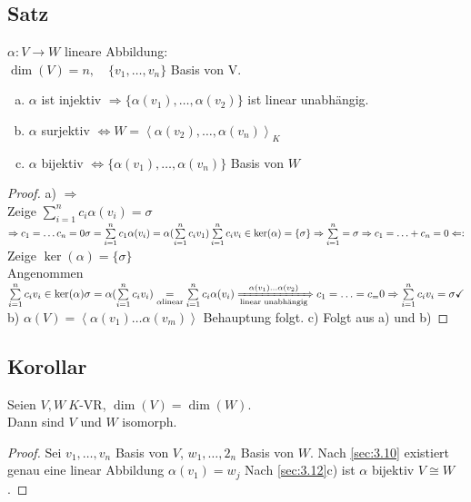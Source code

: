 \subsection{Satz}\label{sec:\thesubsection}
$\alpha: V \to W$ lineare Abbildung:\\
$\dim(V) =n, \quad \{v_1,\ldots,v_n\} $ Basis von V.
\begin{enumerate}[a)]
\item $\alpha$ ist injektiv $\Rightarrow \{ \alpha(v_1),\ldots,\alpha(v_2) \}$ ist linear unabhängig.
\item $\alpha$ surjektiv $\Leftrightarrow W = \left\langle \alpha(v_2),\ldots,\alpha(v_n)\right\rangle_K$
\item $\alpha$ bijektiv $\Leftrightarrow \{ \alpha(v_1),\ldots,\alpha(v_n) \}$ Basis von $W$
\end{enumerate}
\begin{proof}
a) $\Rightarrow$\\
Zeige $\sum\limits^{n}_{i=1}c_i\alpha(v_i) = \sigma$\\
\phantom{Zeige }$\Rightarrow c_1 = \ldots c_n = 0\\
\sigma = \sum\limits^{n}_{i=1} c_1 \alpha (v_i) = \alpha(\sum\limits^{n}_{i=1}c_iv_1)\\
\sum\limits^{n}_{i=1}c_iv_i \in \ker(\alpha) = \{ \sigma \}\\
\Rightarrow \sum\limits^{n}_{i=1} = \sigma \Rightarrow c_1 = \ldots + c_n = 0\\
\Leftarrow:$ Zeige $\ker(\alpha) = \{\sigma \}$\\
Angenommen $\sum\limits^{n}_{i=1}c_iv_i \in \ker(\alpha) 
\sigma = \alpha (\sum\limits^{n}_{i=1}c_iv_i) \underset{\alpha \text{linear}}{=} \sum\limits^{n}_{i=1}c_i\alpha(v_i) \xRightarrow[ \text{linear unabhängig} ]{\alpha(v_1)\ldots\alpha(v_2)}
c_1 = \ldots = c_ = 0\\
\Rightarrow \sum\limits^{n}_{i=1} c_iv_i = \sigma \checkmark$
b) $\alpha(V) = \left\langle \alpha(v_1)\ldots\alpha(v_m)\right\rangle$ Behauptung folgt.
c) Folgt aus a) und b)
\end{proof}
\subsection{Korollar}\label{sec:\thesubsection}
Seien $V,W\ K$-VR, $\dim(V) = \dim(W)$.\\
Dann sind $V$ und $W$ isomorph.
\begin{proof}
Sei $v_1,\ldots,v_n$ Basis von $V$, $w_1,\ldots,2_n$ Basis von $W$. Nach \ref{sec:3.10} existiert genau eine linear Abbildung $\alpha(v_1) = w_j$ Nach \ref{sec:3.12}c) ist $\alpha$ bijektiv $V \cong W$.
\end{proof}
